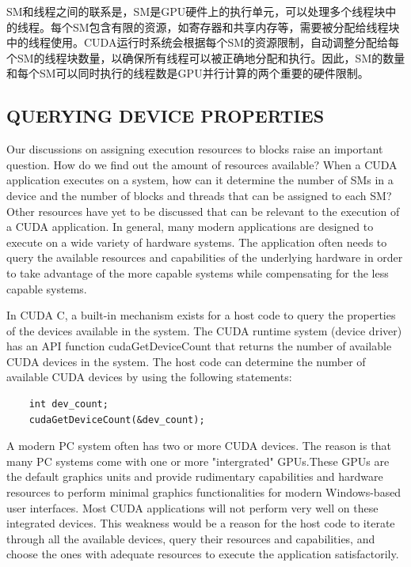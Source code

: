 \documentclass[11pt]{ctexart}
\begin{document}
SM和线程之间的联系是，SM是GPU硬件上的执行单元，可以处理多个线程块中的线程。每个SM包含有限的资源，如寄存器和共享内存等，需要被分配给线程块中的线程使用。CUDA运行时系统会根据每个SM的资源限制，自动调整分配给每个SM的线程块数量，以确保所有线程可以被正确地分配和执行。因此，SM的数量和每个SM可以同时执行的线程数是GPU并行计算的两个重要的硬件限制。

\subsection{QUERYING DEVICE PROPERTIES}

Our discussions on assigning execution resources to blocks raise an important question. How do we find out the amount of resources available? When a CUDA application executes on a system, how can it determine the number of SMs in a device and the number of blocks and threads that can be assigned to each SM? Other resources have yet to be discussed that can be relevant to the execution of a CUDA application. In general, many modern applications are designed to execute on a wide variety of hardware systems. The application often needs to query the available resources and capabilities of the underlying hardware in order to take advantage of the more capable systems while compensating for the less capable systems.

In CUDA C, a built-in mechanism exists for a host code to query the properties of the devices available in the system. The CUDA runtime system (device driver) has an API function cudaGetDeviceCount that returns the number of available CUDA devices in the system. The host code can determine the number of available CUDA devices by using the following statements:

\begin{lstlisting}
	int dev_count;
	cudaGetDeviceCount(&dev_count);
\end{lstlisting}

A  modern PC system often has two  or more CUDA devices. The reason is that many PC systems come with one or more "intergrated" GPUs.These GPUs are the default graphics units and provide rudimentary capabilities and hardware resources to perform minimal graphics functionalities for modern Windows-based user interfaces. Most CUDA applications will not perform very well on these integrated devices. This weakness would be a reason for the host code to iterate through all the available devices, query their resources and capabilities, and choose the ones with adequate resources to execute the application satisfactorily.
\end{document}
